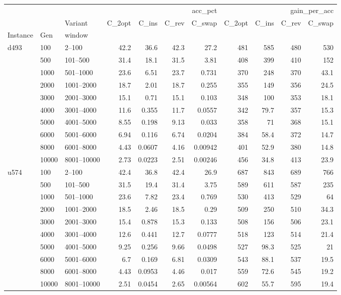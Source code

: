 \begin{tabular}{lllrrrrrrrr}
\toprule
 &  &  & \multicolumn{4}{r}{acc\_pct} & \multicolumn{4}{r}{gain\_per\_acc} \\
 &  & Variant & C\_2opt & C\_ins & C\_rev & C\_swap & C\_2opt & C\_ins & C\_rev & C\_swap \\
Instance & Gen & window &  &  &  &  &  &  &  &  \\
\midrule
\multirow[t]{10}{*}{d493} & 100 & 2–100 & 42.2 & 36.6 & 42.3 & 27.2 & 481 & 585 & 480 & 530 \\
\cline{2-11}
 & 500 & 101–500 & 31.4 & 18.1 & 31.5 & 3.81 & 408 & 399 & 410 & 152 \\
\cline{2-11}
 & 1000 & 501–1000 & 23.6 & 6.51 & 23.7 & 0.731 & 370 & 248 & 370 & 43.1 \\
\cline{2-11}
 & 2000 & 1001–2000 & 18.7 & 2.01 & 18.7 & 0.255 & 355 & 149 & 356 & 24.5 \\
\cline{2-11}
 & 3000 & 2001–3000 & 15.1 & 0.71 & 15.1 & 0.103 & 348 & 100 & 353 & 18.1 \\
\cline{2-11}
 & 4000 & 3001–4000 & 11.6 & 0.355 & 11.7 & 0.0557 & 342 & 79.7 & 357 & 15.3 \\
\cline{2-11}
 & 5000 & 4001–5000 & 8.55 & 0.198 & 9.13 & 0.033 & 358 & 71 & 368 & 15.1 \\
\cline{2-11}
 & 6000 & 5001–6000 & 6.94 & 0.116 & 6.74 & 0.0204 & 384 & 58.4 & 372 & 14.7 \\
\cline{2-11}
 & 8000 & 6001–8000 & 4.43 & 0.0607 & 4.16 & 0.00942 & 401 & 52.9 & 380 & 14.8 \\
\cline{2-11}
 & 10000 & 8001–10000 & 2.73 & 0.0223 & 2.51 & 0.00246 & 456 & 34.8 & 413 & 23.9 \\
\cline{1-11} \cline{2-11}
\multirow[t]{10}{*}{u574} & 100 & 2–100 & 42.4 & 36.8 & 42.4 & 26.9 & 687 & 843 & 689 & 766 \\
\cline{2-11}
 & 500 & 101–500 & 31.5 & 19.4 & 31.4 & 3.75 & 589 & 611 & 587 & 235 \\
\cline{2-11}
 & 1000 & 501–1000 & 23.6 & 7.82 & 23.4 & 0.769 & 530 & 413 & 529 & 64 \\
\cline{2-11}
 & 2000 & 1001–2000 & 18.5 & 2.46 & 18.5 & 0.29 & 509 & 250 & 510 & 34.3 \\
\cline{2-11}
 & 3000 & 2001–3000 & 15.4 & 0.878 & 15.3 & 0.133 & 508 & 156 & 506 & 23.1 \\
\cline{2-11}
 & 4000 & 3001–4000 & 12.6 & 0.441 & 12.7 & 0.0777 & 518 & 123 & 514 & 21.4 \\
\cline{2-11}
 & 5000 & 4001–5000 & 9.25 & 0.256 & 9.66 & 0.0498 & 527 & 98.3 & 525 & 21 \\
\cline{2-11}
 & 6000 & 5001–6000 & 6.7 & 0.169 & 6.81 & 0.0309 & 543 & 88.1 & 537 & 19.5 \\
\cline{2-11}
 & 8000 & 6001–8000 & 4.43 & 0.0953 & 4.46 & 0.017 & 559 & 72.6 & 545 & 19.2 \\
\cline{2-11}
 & 10000 & 8001–10000 & 2.51 & 0.0454 & 2.65 & 0.00564 & 602 & 55.7 & 595 & 19.4 \\
\cline{1-11} \cline{2-11}
\bottomrule
\end{tabular}
